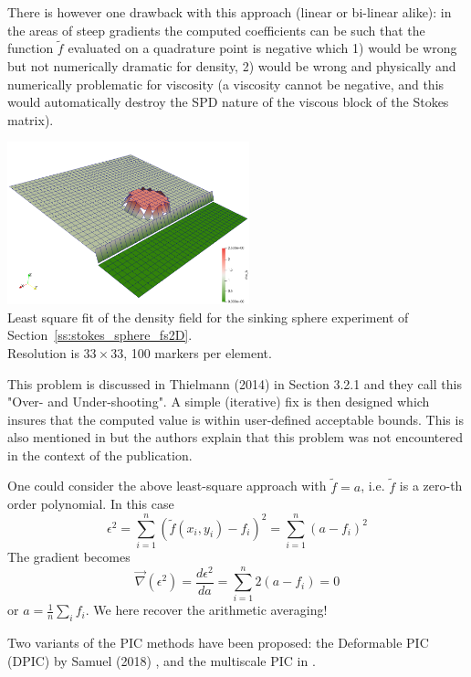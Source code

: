 There is however one drawback with this approach (linear or bi-linear alike):
in the areas of steep gradients the computed coefficients can be such that 
the function $\tilde{f}$ evaluated on a quadrature point 
is negative  which 1) would be wrong but not numerically 
dramatic for density, 2) would be wrong and physically and numerically 
problematic for viscosity (a viscosity cannot be negative, and this would 
automatically destroy the SPD nature of the viscous block of the Stokes matrix).

\begin{center}
\includegraphics[width=7cm]{images/tracking/rho_ls}\\
{\captionfont Least square fit of the density field for the 
sinking sphere experiment of Section~\ref{ss:stokes_sphere_fs2D}.\\
Resolution is $33\times33$, 100 markers per element.
}
\end{center}


This problem is discussed in Thielmann \etal (2014) in Section 3.2.1 and they 
call this "Over- and Under-shooting". A simple (iterative) 
fix is then designed which insures that the computed value is within user-defined 
acceptable bounds. This is also mentioned in \cite{galb19} but the authors 
explain that this problem was not encountered in the context of the publication.

\begin{remark}
One could consider the above least-square approach with $\tilde{f}=a$, i.e. $\tilde{f}$ is
a zero-th order polynomial. In this case
\[
\epsilon^2 = \sum_{i=1}^n ( \tilde{f}(x_i,y_i)-f_i)^2 = \sum_{i=1}^n (a-f_i)^2 
\]
The gradient becomes
\[
\vec\nabla(\epsilon^2)= \frac{d \epsilon^2}{da} = \sum_{i=1}^n 2 (a-f_i) = 0
\]
or $a=\frac1n \sum_i f_i$. We here recover the arithmetic averaging!
\end{remark}





\begin{remark}
Two variants of the PIC methods have been proposed: the Deformable PIC (DPIC) 
by Samuel (2018) \cite{samu18}, and the multiscale PIC in \cite{asmo12}.
\end{remark}

